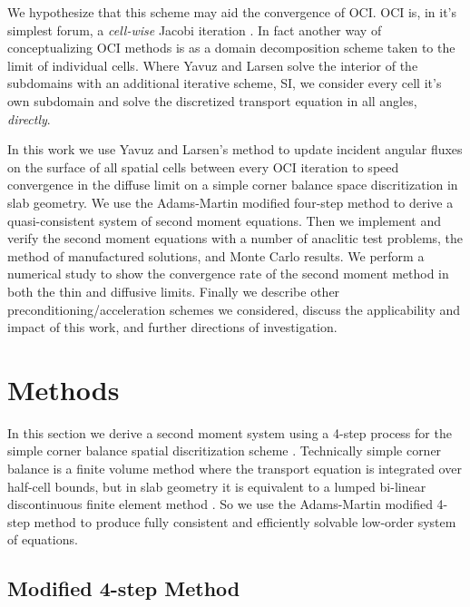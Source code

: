 We hypothesize that this scheme may aid the convergence of OCI.
OCI is, in it's simplest forum, a \textit{cell-wise} Jacobi iteration \cite{rosa_cellwise_2013}.
In fact another way of conceptualizing OCI methods is as a domain decomposition scheme taken to the limit of individual cells.
Where Yavuz and Larsen solve the interior of the subdomains with an additional iterative scheme, SI, we consider every cell it's own subdomain and solve the discretized transport equation in all angles, \textit{directly}.

In this work we use Yavuz and Larsen's method to update incident angular fluxes on the surface of all spatial cells between every OCI iteration to speed convergence in the diffuse limit on a simple corner balance space discritization in slab geometry.
We use the Adams-Martin modified four-step method to derive a quasi-consistent system of second moment equations.
Then we implement and verify the second moment equations with a number of anaclitic test problems, the method of manufactured solutions, and Monte Carlo results.
We perform a numerical study to show the convergence rate of the second moment method in both the thin and diffusive limits.
Finally we describe other preconditioning/acceleration schemes we considered, discuss the applicability and impact of this work, and further directions of investigation.


\section{Methods}
\label{sec:methods}

In this section we derive a second moment system using a 4-step process for the simple corner balance spatial discritization scheme \cite{adams_subcell_1997}.
Technically simple corner balance is a finite volume method where the transport equation is integrated over half-cell bounds, but in slab geometry it is equivalent to a lumped bi-linear discontinuous finite element method \cite{adams_subcell_1997}.
So we use the Adams-Martin modified 4-step method to produce fully consistent and efficiently solvable low-order system of equations.

\subsection{Modified 4-step Method}
\label{sec:modified4step}

